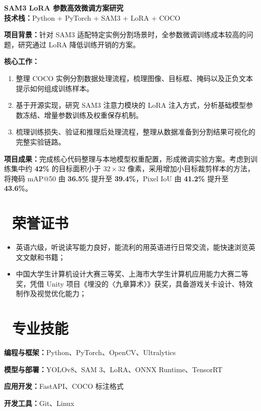 \documentclass[11pt]{article}
\newlength{\interProjectSpacing}
\newcommand{\projectsep}{\vspace{\interProjectSpacing}}
\newlength{\intraProjectTitleSep}
\newcommand{\titlebreak}{\\[\intraProjectTitleSep]}
\newlength{\intraProjectListTopSep}
\newcommand{\cvsection}[2]{\section{\makebox[1.1em][c]{\color{CVBlue}#1}\ #2}}
\begin{document}
\projectsep
\textbf{SAM3 LoRA 参数高效微调方案研究}\titlebreak
\textbf{技术栈：}Python + PyTorch + SAM3 + LoRA + COCO\par
\textbf{项目背景：}针对 SAM3 适配特定实例分割场景时，全参数微调训练成本较高的问题，研究通过 LoRA 降低训练开销的方案。\par
\textbf{核心工作：}
\begin{enumerate}[topsep=\intraProjectListTopSep]
  \item 整理 COCO 实例分割数据处理流程，梳理图像、目标框、掩码以及正负文本提示如何组成训练样本。
  \item 基于开源实现，研究 SAM3 注意力模块的 LoRA 注入方式，分析基础模型参数冻结、增量参数训练及权重保存机制。
  \item 梳理训练损失、验证和推理后处理流程，整理从数据准备到分割结果可视化的完整实验链路。
\end{enumerate}
\textbf{项目成果：}完成核心代码整理与本地模型权重配置，形成微调实验方案。考虑到训练集中约 \textbf{42\%} 的目标面积小于 \(32\times32\) 像素，采用增加小目标裁剪样本的方法，将掩码 mAP@50 由 \textbf{36.5\%} 提升至 \textbf{39.4\%}，Pixel IoU 由 \textbf{41.2\%} 提升至 \textbf{43.6\%}。

\cvsection{\faList}{荣誉证书}
\begin{itemize}
  \item 英语六级，听说读写能力良好，能流利的用英语进行日常交流，能快速浏览英文文献和书籍；
  \item 中国大学生计算机设计大赛三等奖、上海市大学生计算机应用能力大赛二等奖，凭借 Unity 项目《埋没的〈九章算术〉》获奖，具备游戏关卡设计、特效制作及视觉优化能力；
\end{itemize}

\cvsection{\faCogs}{专业技能}
\textbf{编程与框架：}Python、PyTorch、OpenCV、Ultralytics\par
\textbf{模型与部署：}YOLOv8、SAM 3、LoRA、ONNX Runtime、TensorRT\par
\textbf{应用开发：}FastAPI、COCO 标注格式\par
\textbf{开发工具：}Git、Linux
\end{document}
